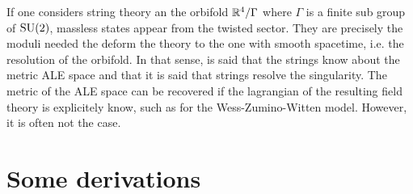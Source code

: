 \documentclass[a4paper,10pt]{article}
\begin{document}
    If one considers string theory an the orbifold $\mathbb{R}^4/\Gamma$ where $\Gamma$ is a finite sub group of $\text{SU}(2)$, massless states appear from the twisted sector. They are precisely the moduli needed the deform the theory to the one with smooth spacetime, i.e. the resolution of the orbifold. In that sense, is said that the strings know about the metric ALE space and that it is said that strings resolve the singularity. The metric of the ALE space can be recovered if the lagrangian of the resulting field theory is explicitely know, such as for the Wess-Zumino-Witten model. However, it is often not the case.


\section{Some derivations}

    \subsection{}\label{app:compsum}
\end{document}
